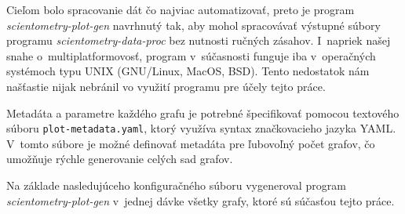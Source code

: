 Cieľom bolo spracovanie dát čo najviac automatizovať, preto je program
\emph{scientometry-plot-gen} navrhnutý tak, aby mohol spracovávať výstupné
súbory programu \emph{scientometry-data-proc} bez nutnosti ručných zásahov.
I~napriek našej snahe o~multiplatformovosť, program v~súčasnosti funguje iba
v~operačných systémoch typu UNIX (GNU/Linux, MacOS, BSD). Tento nedostatok nám
našťastie nijak nebránil vo využití programu pre účely tejto práce.

Metadáta a parametre každého grafu je potrebné špecifikovať pomocou textového
súboru \verb|plot-metadata.yaml|, ktorý využíva syntax značkovacieho jazyka
YAML. V~tomto súbore je možné definovať metadáta pre ľubovoľný počet grafov, čo
umožňuje rýchle generovanie celých sad grafov.

Na základe nasledujúceho konfiguračného súboru vygeneroval program
\emph{scientometry-plot-gen} v~jednej dávke všetky grafy, ktoré sú súčasťou
tejto práce.


